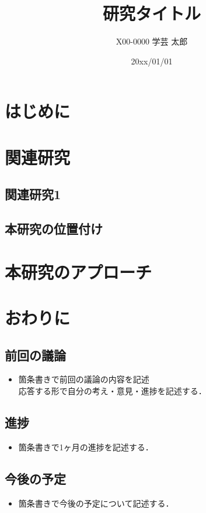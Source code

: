 \documentclass[a4j,twocolumn]{ujarticle}
\begin{document}
\title{研究タイトル} %
\author{X00-0000 学芸 太郎} %
\date{20xx/01/01} %
\maketitle

\section{はじめに}

\section{関連研究}

\subsection{関連研究1}

\subsection{本研究の位置付け}

\section{本研究のアプローチ}

\section{おわりに}

\begin{thebibliography}{10}
\end{thebibliography}

\subsection*{前回の議論}
\begin{itemize}
    \item 箇条書きで前回の議論の内容を記述 \\
    応答する形で自分の考え・意見・進捗を記述する．
\end{itemize}

\subsection*{進捗}
\begin{itemize}
    \item 箇条書きで1ヶ月の進捗を記述する．
\end{itemize}

\subsection*{今後の予定}
\begin{itemize}
    \item 箇条書きで今後の予定について記述する．
\end{itemize}
\end{document}
